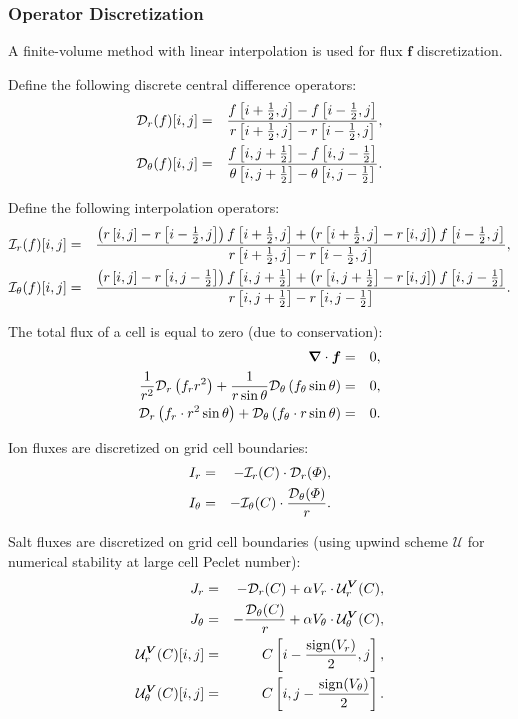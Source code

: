 \subsubsection{Operator Discretization}
A finite-volume method with linear interpolation is used for flux 
$\boldsymbol{f}$ discretization. 

Define the following discrete central difference operators:
\begin{eqnarray}
\mathcal{D}_r(f)[i,j] &=& \frac{f\left[i+\frac{1}{2},j\right] - f\left[i-\frac{1}{2},j\right]}
                       {r\left[i+\frac{1}{2},j\right] - r\left[i-\frac{1}{2},j\right]}, \\
\mathcal{D}_\theta(f)[i,j] &=& \frac{f\left[i,j+\frac{1}{2}\right] - f\left[i,j-\frac{1}{2}\right]}
					   {\theta\left[i,j+\frac{1}{2}\right] - \theta\left[i,j-\frac{1}{2}\right]}.
\end{eqnarray}

Define the following interpolation operators:
\begin{eqnarray}
\mathcal{I}_r(f)[i,j] &=& \frac{
\left(r\left[i,j\right] - r\left[i-\frac{1}{2},j\right]\right) 
  f\left[i+\frac{1}{2},j\right] + 
\left(r\left[i+\frac{1}{2},j\right] - r\left[i,j\right]\right) 
  f\left[i-\frac{1}{2},j\right] 
}{r\left[i+\frac{1}{2},j\right] - r\left[i-\frac{1}{2},j\right]},
\\
\mathcal{I}_\theta(f)[i,j] &=& 
\frac{
\left(r\left[i,j\right] - r\left[i,j-\frac{1}{2}\right]\right) 
  f\left[i,j+\frac{1}{2}\right] + 
\left(r\left[i,j+\frac{1}{2}\right] - r\left[i,j\right]\right) 
  f\left[i,j-\frac{1}{2}\right] 
}{r\left[i,j+\frac{1}{2}\right] - r\left[i,j-\frac{1}{2}\right]}.
\end{eqnarray}

The total flux of a cell is equal to zero (due to conservation):
\begin{eqnarray}
\boldsymbol{\nabla} \cdot \boldsymbol{f} &=& 0, 
\\
\frac{1}{r^2} \mathcal{D}_r\left(f_r r^2\right) + 
\frac{1}{r \sin\theta} \mathcal{D}_\theta\left(f_\theta \sin\theta\right) &=& 0, 
\\
\mathcal{D}_r\left(f_r \cdot r^2 \sin\theta\right) + 
\mathcal{D}_\theta\left(f_\theta \cdot r \sin\theta\right) &=& 0. 
\end{eqnarray}

Ion fluxes are discretized on grid cell boundaries:
\begin{eqnarray}
I_r &=& -\mathcal{I}_r(C) \cdot \mathcal{D}_r(\varPhi), \\
I_\theta &=& -\mathcal{I}_\theta(C) \cdot \frac{\mathcal{D}_\theta(\varPhi)}{r}.
\end{eqnarray}

Salt fluxes are discretized on grid cell boundaries 
(using upwind scheme $\mathcal{U}$ for numerical stability at large cell Peclet number):
\begin{eqnarray}
J_r &=& -\mathcal{D}_r(C) + \alpha V_r \cdot \mathcal{U}^{\boldsymbol{V}}_r (C), \\
J_\theta &=& -\frac{\mathcal{D}_\theta(C)}{r} + \alpha V_\theta \cdot \mathcal{U}^{\boldsymbol{V}}_\theta (C), \\
 \mathcal{U}^{\boldsymbol{V}}_r(C)[i,j] &=& C\left[i-\frac{\mathrm{sign}(V_r)}{2}, j\right], \\
 \mathcal{U}^{\boldsymbol{V}}_\theta(C)[i,j] &=& C\left[i, j-\frac{\mathrm{sign}(V_\theta)}{2}\right]. 
\end{eqnarray}

